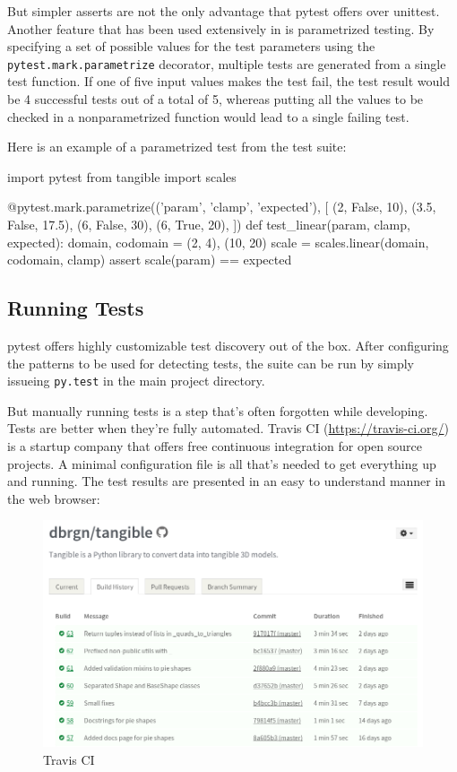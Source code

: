 But simpler asserts are not the only advantage that pytest offers over unittest.
Another feature that has been used extensively in \tangible{} is parametrized
testing. By specifying a set of possible values for the test parameters using
the \texttt{pytest.mark.parametrize} decorator, multiple tests are generated
from a single test function. If one of five input values makes the test fail,
the test result would be 4 successful tests out of a total of 5, whereas putting
all the values to be checked in a nonparametrized function would lead to a
single failing test.

Here is an example of a parametrized test from the \tangible{} test suite:

\vspace{.5\baselineskip}
\begin{pythoncode}
import pytest
from tangible import scales

@pytest.mark.parametrize(('param', 'clamp', 'expected'), [
    (2, False, 10),
    (3.5, False, 17.5),
    (6, False, 30),
    (6, True, 20),
])
def test_linear(param, clamp, expected):
    domain, codomain = (2, 4), (10, 20)
    scale = scales.linear(domain, codomain, clamp)
    assert scale(param) == expected
\end{pythoncode}


\subsection{Running Tests}

pytest offers highly customizable test discovery out of the box. After
configuring the patterns to be used for detecting tests, the suite can be run
by simply issueing \texttt{py.test} in the main project directory.

But manually running tests is a step that's often forgotten while developing.
Tests are better when they're fully automated. Travis CI
(\url{https://travis-ci.org/}) is a startup company that offers free continuous
integration for open source projects. A minimal configuration file is all that's
needed to get everything up and running. The test results are presented in an
easy to understand manner in the web browser:

\begin{figure}[H]
	\centering
	\includegraphics[width=\textwidth]{images/travis.png}
	\caption{Travis CI}
	\label{img:travis}
\end{figure}

